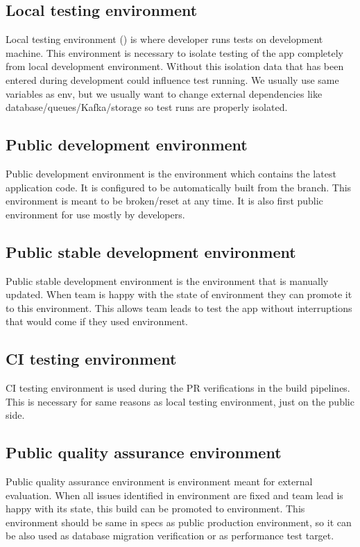     \subsection{Local testing environment}\label{subsec:local-testing-environment}
    Local testing environment () is where developer runs tests on development
    machine.
    This environment is necessary to isolate testing of the app
    completely from local development environment.
    Without this isolation
    data that has been entered during development could influence
    test running.
    We usually use same variables as  env, but we usually want to change external dependencies
    like database/queues/Kafka/storage so test runs are properly isolated.

    \subsection{Public development environment}\label{subsec:public-development-environment}
    Public development environment is the environment which contains the
    latest application code.
    It is configured to be automatically built
    from the  branch.
    This environment is meant to be
    broken/reset at any time.
    It is also first public environment for use
    mostly by developers.

    \subsection{Public stable development environment}\label{subsec:public-stable-development-environment}
    Public stable development environment  is the environment that is
    manually updated.
    When team is happy with the state of  environment
    they can promote it to this environment.
    This allows team leads
    to test the app without interruptions that would come if they used 
    environment.

    \subsection{CI testing environment}\label{subsec:ci-testing-environment}
    CI testing environment is used during the PR verifications in the build
    pipelines.
    This is necessary for same reasons as local testing environment,
    just on the public side.

    \subsection{Public quality assurance environment}\label{subsec:public-quality-assurance-environment}
    Public quality assurance environment  is environment meant
    for external evaluation.
    When all issues identified in  environment
    are fixed and team lead is happy with its state, this build can be promoted
    to  environment.
    This environment should be same in specs as
    public production environment, so it can be also used as database
    migration verification or as performance test target.

